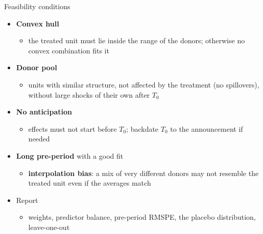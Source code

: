 \begin{frame}{Feasibility conditions}
\itemsize{\small}
\begin{itemize}
    \item \textbf{Convex hull} 
    \begin{itemize}
        \item the treated unit must lie inside the range of the donors; otherwise no convex combination fits it
    \end{itemize}
    \item \textbf{Donor pool}
    \begin{itemize}
        \item units with similar structure, not affected by the treatment (no spillovers), without large shocks of their own after $T_0$
    \end{itemize}
    \item \textbf{No anticipation}
    \begin{itemize}
        \item effects must not start before $T_0$; backdate $T_0$ to the announcement if needed
    \end{itemize}
    \item \textbf{Long pre-period} with a good fit
    \begin{itemize}
        \item \textbf{interpolation bias}: a mix of very different donors may not resemble the treated unit even if the averages match
    \end{itemize}
    \item Report
    \begin{itemize}
        \item weights, predictor balance, pre-period RMSPE, the placebo distribution, leave-one-out
    \end{itemize}
\end{itemize}
\end{frame}

